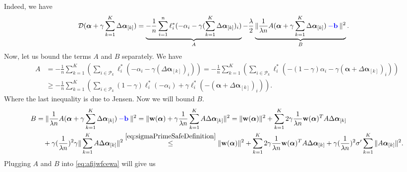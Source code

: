 \documentclass{article}
\newcommand{\wv}{ {\bf w}}
\newcommand{\alphav}{ {\boldsymbol \alpha}}
\newcommand{\bv}{ {\bf b}}
\newcommand{\0}{ {\bf 0}}
\newcommand{\vsubset}[2]{#1_{[#2]}}
\newcommand{\bD}{\mathcal{D}}
\theoremstyle{plain}
\theoremstyle{definition}
\begin{document}
Indeed, we have
\begin{align}
\label{eq:afijwfcewa}
\bD(\alphav
+\gamma 
\sum_{k=1}^K
\vsubset{\Delta \alphav}{k}
)
&=
\underbrace{-\frac1n\sum_{i=1}^n
\ell_i^*(-\alpha_i
    -\gamma (\sum_{k=1}^K
     \vsubset{\Delta \alphav}{k})_i)}_{A} -\frac\lambda2 
\underbrace{\|\frac1{\lambda n}
A (\alphav + \gamma 
  \sum_{k=1}^K \vsubset{\Delta \alphav}{k}) \mathbin{\textcolor{blue}{-\bv}} \|^2}_B.
\end{align}
Now, let us bound the terms $A$ and $B$ separately.
We have
\begin{align*}
A
&=
 -\frac1n\sum_{k=1}^K
 \left(
 \sum_{i\in \mathcal{P}_k}
 \ell_i^*(-\alpha_i-\gamma 
  (\vsubset{\Delta \alphav}{k})_i)
 \right)
=
 -\frac1n\sum_{k=1}^K
 \left(
 \sum_{i\in \mathcal{P}_k}
 \ell_i^*(-(1-\gamma)
   \alpha_i-\gamma 
  (\alphav + \vsubset{\Delta \alphav}{k})_i)
 \right) 
\\
&\geq 
 -\frac1n\sum_{k=1}^K
 \left(
 \sum_{i\in \mathcal{P}_k}
 (1-\gamma) \ell_i^*(-
   \alpha_i)
   +\gamma 
  \ell_i^*(-(\alphav + \vsubset{\Delta \alphav}{k})_i)
 \right). 
\end{align*}
Where the last inequality is due to Jensen.
Now we will bound $B$.
\begin{align*}
B
&=
\|\frac1{\lambda n}
A (\alphav + \gamma 
  \sum_{k=1}^K \vsubset{\Delta \alphav}{k}) \mathbin{\textcolor{blue}{-\bv}} \|^2
=
\|\wv(\alphav) + \gamma\frac1{\lambda n}
   \sum_{k=1}^K A\vsubset{\Delta \alphav}{k}  \|^2  
   =
\|\wv(\alphav)   \|^2
+
\sum_{k=1}^K
2\gamma\frac1{\lambda n} 
\wv(\alphav)^T  
    A\vsubset{\Delta \alphav}{k}  
\\&\quad +
\gamma
(\frac1{\lambda n})^2
\gamma
\|  
   \sum_{k=1}^K A\vsubset{\Delta \alphav}{k}  \|^2  
\overset{\eqref{eq:sigmaPrimeSafeDefinition}}
{\leq}
\|\wv(\alphav)   \|^2
+
\sum_{k=1}^K
2\gamma\frac1{\lambda n} 
\wv(\alphav)^T  
    A\vsubset{\Delta \alphav}{k}  
   +
\gamma
(\frac1{\lambda n})^2
\sigma'
   \sum_{k=1}^K \|A \vsubset{\alphav}{k}\|^2.    
\end{align*}  
Plugging $A$ and $B$ into 
  \eqref{eq:afijwfcewa} 
  will give us
\end{document}

